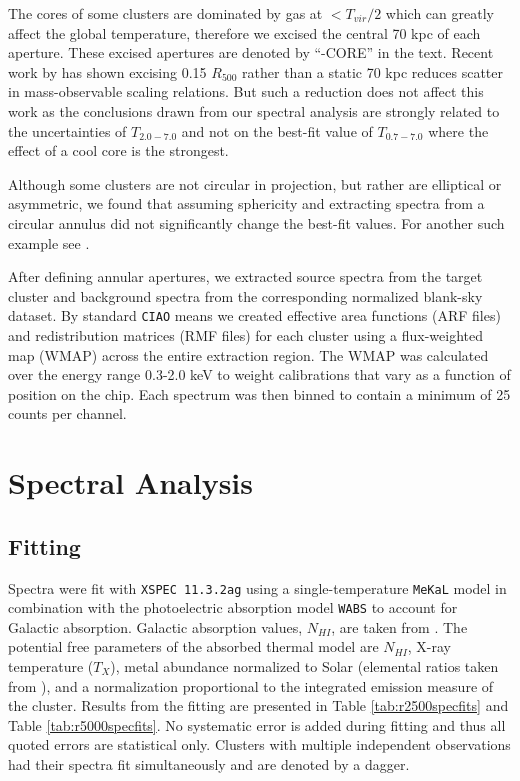 \documentclass{emulateapj}
\begin{document}
The cores of some clusters are dominated by gas at $< T_{vir}/2$ which
can greatly affect the global temperature, therefore we excised the
central 70 kpc of each aperture. These excised apertures are denoted
by ``-CORE'' in the text. Recent work by \citealt{2007astro.ph..3504M}
has shown excising 0.15 $R_{500}$ rather than a static 70 kpc reduces
scatter in mass-observable scaling relations. But such a reduction
does not affect this work as the conclusions drawn from our spectral
analysis are strongly related to the uncertainties of $T_{2.0-7.0}$
and not on the best-fit value of $T_{0.7-7.0}$ where the effect of a
cool core is the strongest.

Although some clusters are not circular in projection, but rather are
elliptical or asymmetric, we found that assuming sphericity and
extracting spectra from a circular annulus did not significantly
change the best-fit values. For another such example see
\cite{2005MNRAS.359.1481B}.

After defining annular apertures, we extracted source spectra from the
target cluster and background spectra from the corresponding
normalized blank-sky dataset. By standard {\tt CIAO} means we created
effective area functions (ARF files) and redistribution matrices (RMF
files) for each cluster using a flux-weighted map (WMAP) across the
entire extraction region. The WMAP was calculated over the energy
range 0.3-2.0 keV to weight calibrations that vary as a function of
position on the chip. Each spectrum was then binned to contain a
minimum of 25 counts per channel.

\section{Spectral Analysis} \label{sec:specan}

\subsection{Fitting} \label{sec:fitting}

Spectra were fit with {\tt XSPEC 11.3.2ag} \citep{1996ASPC..101...17A}
using a single-temperature {\tt MeKaL} model in combination with the
photoelectric absorption model {\tt WABS} \citep{1983ApJ...270..119M}
to account for Galactic absorption. Galactic absorption values,
$N_{HI}$, are taken from \cite{1990ARA&A..28..215D}. The potential
free parameters of the absorbed thermal model are
$N_{HI}$, X-ray temperature ($T_{X}$), metal abundance normalized to Solar
(elemental ratios taken from \cite{1989GeCoA..53..197A}), and a
normalization proportional to the integrated emission measure of the
cluster. Results from the fitting are presented in Table
\ref{tab:r2500specfits} and Table \ref{tab:r5000specfits}. No
systematic error is added during fitting and thus all quoted errors
are statistical only. Clusters with multiple independent observations
had their spectra fit simultaneously and are denoted by a dagger.
\end{document}

